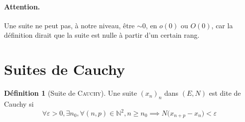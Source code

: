 \documentclass[11pt,a4paper]{report}
\theoremstyle{definition}
\newtheorem{dfn}[theorem]{Définition}
\begin{document}
\paragraph{Attention.} Une suite ne peut pas, à notre niveau, être $\sim 0$, en $o(0)$ ou $O(0)$, car la définition dirait que la suite est nulle à partir d'un certain rang.
\section{Suites de Cauchy} %
\label{sec:suites_de_cauchy}
\begin{dfn}[Suite de \textsc{Cauchy}]
    Une suite $(x_n)_n$ dans $(E,N)$ est dite de Cauchy si 
    \begin{equation}
    \forall \varepsilon > 0, \exists n_0, \forall (n,p) \in \mathbb{N}^2, n\ge n_0 \implies \boxed{N\big( x_{n+p} - x_n \big)< \varepsilon}
    \end{equation}
\end{dfn}

\end{document}
